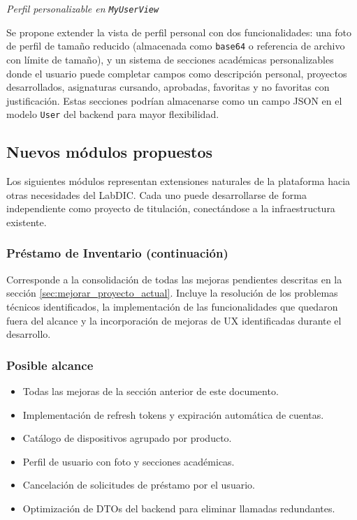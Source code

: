 \emph{Perfil personalizable en \texttt{MyUserView}}

Se propone extender la vista de perfil personal con dos funcionalidades: una foto de 
perfil de tamaño reducido (almacenada como \texttt{base64} o referencia de archivo 
con límite de tamaño), y un sistema de secciones académicas personalizables donde el 
usuario puede completar campos como descripción personal, proyectos desarrollados, 
asignaturas cursando, aprobadas, favoritas y no favoritas con justificación. Estas 
secciones podrían almacenarse como un campo JSON en el modelo \texttt{User} del 
backend para mayor flexibilidad.

\subsection{Nuevos módulos propuestos}

Los siguientes módulos representan extensiones naturales de la plataforma hacia otras 
necesidades del LabDIC. Cada uno puede desarrollarse de forma independiente como 
proyecto de titulación, conectándose a la infraestructura existente.

\subsubsection{Préstamo de Inventario (continuación)}

Corresponde a la consolidación de todas las mejoras pendientes descritas en la 
sección \ref{sec:mejorar_proyecto_actual}. Incluye la resolución de los problemas técnicos identificados, la 
implementación de las funcionalidades que quedaron fuera del alcance y la 
incorporación de mejoras de UX identificadas durante el desarrollo.

\subsubsection*{Posible alcance}

\begin{itemize}
	\item Todas las mejoras de la sección anterior de este documento.
	\item Implementación de refresh tokens y expiración automática de cuentas.
	\item Catálogo de dispositivos agrupado por producto.
	\item Perfil de usuario con foto y secciones académicas.
	\item Cancelación de solicitudes de préstamo por el usuario.
	\item Optimización de DTOs del backend para eliminar llamadas redundantes.
\end{itemize}

